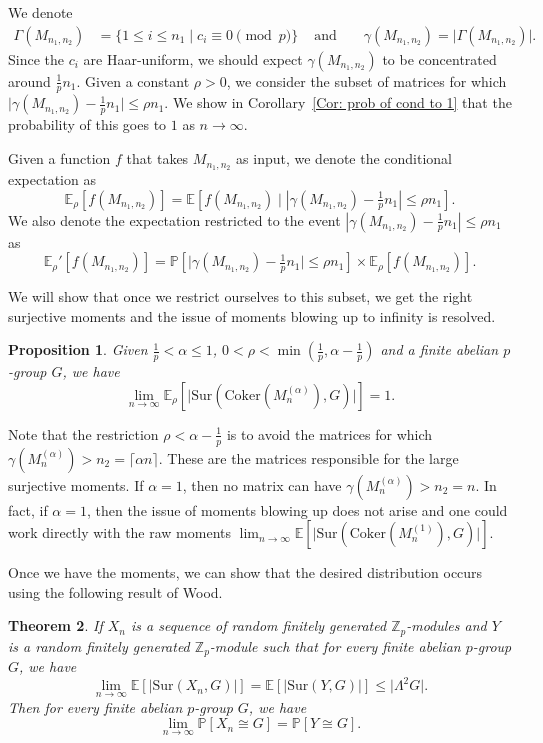 \documentclass[12pt]{amsart}
\newtheorem{theorem}{Theorem}[section]
\newtheorem{proposition}[theorem]{Proposition}
\theoremstyle{definition}
\newcommand{\PPP}{\mathbb{P}}
\newcommand{\PPb}[1]{\PPP\left[#1\right]}
\newcommand{\Mnot}{M_{n_1,n_2}}
\newcommand{\Mna}{M_{n}^{(\alpha)}}
\newcommand{\Erho}{\E_{\rho}}
\newcommand{\Erhop}{\E_{\rho}'}
\newcommand{\abs}[1]{\vert#1\vert}
\newcommand{\Zp}{\Z_p}
\newcommand{\E}{\mathbb{E}}
\newcommand{\Z}{\mathbb{Z}}
\newcommand{\Coker}{\text{Coker}}
\newcommand{\Sur}{\text{Sur}}
\newcommand{\ceil}[1]{\lceil#1\rceil}
\begin{document}
We denote
\begin{align}
\Gamma(\Mnot)&=\Big\{1\leq i\leq n_1\mid c_i\equiv 0\pmod{p}\Big\}
&\text{ and }&
&\gamma(\Mnot)=\abs{\Gamma(\Mnot)} .
\end{align}
Since the $c_i$ are Haar-uniform, we should expect $\gamma(\Mnot)$ to be concentrated around $\frac{1}{p} n_1$. Given a constant $\rho>0$, we consider the subset of matrices for which $\abs{\gamma(\Mnot) -\frac{1}{p}n_1}\leq\rho n_1$. We show in Corollary~\ref{Cor: prob of cond to 1} that the probability of this goes to $1$ as $n\to\infty$.

Given a function $f$ that takes $\Mnot$ as input, we denote the conditional expectation as
\[
\Erho[f(\Mnot)]
=\E[f(\Mnot) \mid |\gamma(\Mnot)-\tfrac{1}{p} n_1|\leq \rho n_1].
\]
We also denote the expectation restricted to the event $|\gamma(\Mnot)-\tfrac{1}{p} n_1|\leq \rho n_1$ as
\[
\Erhop[f(\Mnot)]
=\PPb{\abs{\gamma(\Mnot)-\tfrac{1}{p} n_1}\leq \rho n_1} \times \E_{\rho}[f(\Mnot)].
\]

We will show that once we restrict ourselves to this subset, we get the right surjective moments and the issue of moments blowing up to infinity is resolved.

\begin{proposition}\label{Prop: ind diag sur}
Given $\frac{1}{p}<\alpha\leq 1$, $0<\rho<\min(\frac{1}{p},\alpha-\frac{1}{p})$  and a finite abelian $p$-group $G$, we have
\[
\lim_{n\to\infty} \Erho[\abs{\Sur(\Coker(\Mna),G)}] =1.
\]
\end{proposition}

Note that the restriction $\rho<\alpha-\frac{1}{p}$ is to avoid the matrices for which $\gamma(\Mna)> n_2=\ceil{\alpha n}$. These are the matrices responsible for the large surjective moments.
If $\alpha=1$, then no matrix can have $\gamma(\Mna)> n_2=n$. In fact, if $\alpha=1$, then the issue of moments blowing up does not arise and one could work directly with the raw moments $\lim_{n\to\infty} \E[\big|\Sur(\Coker(M_n^{(1)}),G)\big|]$.

Once we have the moments, we can show that the desired distribution occurs using the following result of Wood.
\begin{theorem}\cite[Theorem 8.3]{wood2017distribution}\label{Thm: Wood universality}
If $X_n$ is a sequence of random finitely generated $\Zp$-modules and $Y$ is a random finitely generated $\Zp$-module such that for every finite abelian $p$-group $G$, we have
\[
\lim_{n\to\infty} \E[\abs{\Sur(X_n,G)}]
=\E[\abs{\Sur(Y,G)}]
\leq \abs{\Lambda^2G}.
\]
Then for every finite abelian $p$-group $G$, we have
\[
\lim_{n\to\infty}
\PPP[X_n\cong G]
=\PPP[Y\cong G].
\]    
\end{theorem}
\end{document}
